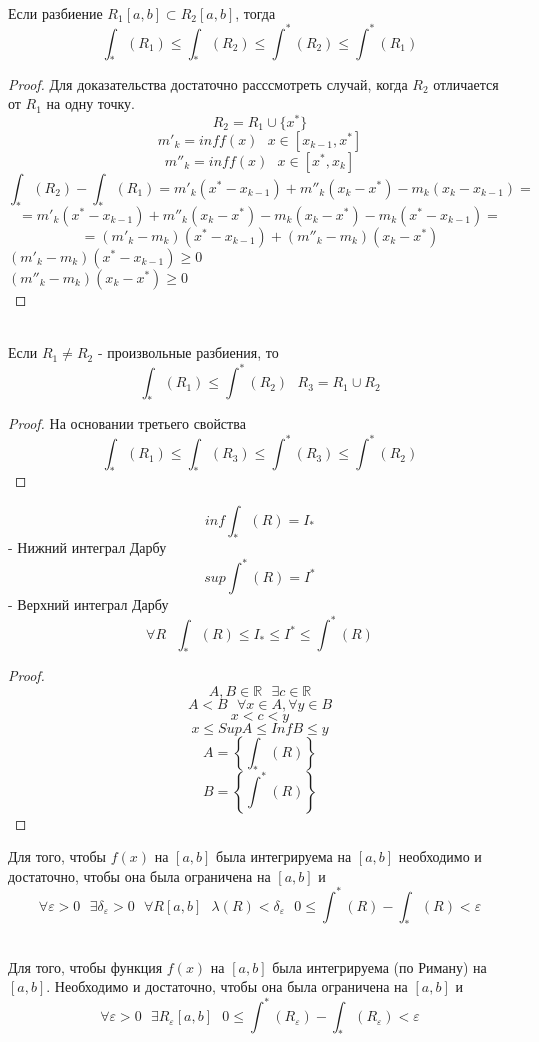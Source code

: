 \\
Если разбиение $R_1 [a,b] \subset R_2 [a,b]$, тогда
\[\int_* (R_1) \le \int_* (R_2) \le \int^* (R_2) \le \int^* (R_1)\]

\begin{proof}
  Для доказательства достаточно расссмотреть случай, когда $R_2$ отличается от
  $R_1$ на одну точку.
  \[R_2 = R_1 \cup \{x^*\}\]
  \[m'_k = inf f(x) ~~~ x \in [x_{k - 1}, x^*]\]
  \[m''_k = inf f(x) ~~~ x \in [x^*, x_k]\]
  \[
     \int_* (R_2) - \int_* (R_1) = m'_k (x^* - x_{k-1}) + m''_k (x_k - x^*) -
     m_k (x_k - x_{k - 1}) =
  \]
  \[
     = m'_k (x^* - x_{k - 1}) + m''_k (x_k - x^*) - m_k (x_k - x^*) -
     m_k (x^* - x_{k - 1}) =
  \]
  \[
     = (m'_k - m_k)(x^* - x_{k - 1}) + (m''_k - m_k)
     (x_k - x^*)
  \]
     $(m'_k - m_k)(x^* - x_{k - 1}) \ge 0 $\\
     $(m''_k - m_k)(x_k - x^*) \ge 0$\\
\end{proof}

\\
Если $R_1 \not= R_2$ - произвольные разбиения, то
\[\int_* (R_1) \le \int^* (R_2) ~~~ R_3 = R_1 \cup R_2\]

\begin{proof}
  На основании третьего свойства
  \[\int_* (R_1) \le \int_* (R_3) \le \int^* (R_3) \le \int^* (R_2)\]
\end{proof}

\[inf \int_* (R) = I_*\] - Нижний интеграл Дарбу
\[sup \int^* (R) = I^*\] - Верхний интеграл Дарбу
\[\forall R ~~~ \int_* (R) \le I_* \le I^* \le \int^* (R)\]

\begin{proof}
  \[A, B \in \mathbb R ~~~ \exists c \in \mathbb R\]
  \[A < B ~~~ \forall x \in A, \forall y \in B\]
  \[x < c < y\]
  \[x \le Sup A \le Inf B \le y\]
  \[A = \left\{ \int_* (R) \right\}\]
  \[B = \left\{ \int^* (R) \right\}\]
\end{proof}

\begin{theorem}
  Для того, чтобы $f(x)$ на $[a,b]$ была интегрируема на $[a,b]$ необходимо
  и достаточно, чтобы она была ограничена на $[a,b]$ и
  \[
    \forall \varepsilon > 0 ~~~ \exists \delta_\varepsilon > 0 ~~~ \forall R
    [a,b] ~~~ \lambda (R) < \delta_\varepsilon ~~~ 0 \le \int^* (R) -
    \int_* (R) < \varepsilon
  \]

  \\
  Для того, чтобы функция $f(x)$ на $[a,b]$ была интегрируема (по Риману)
  на $[a,b]$. Необходимо и достаточно, чтобы она была ограничена на $[a,b]$ и
  \[
    \forall \varepsilon > 0 ~~~ \exists R_\varepsilon [a,b] ~~~ 0 \le \int^*
    (R_\varepsilon) - \int_* (R_\varepsilon) < \varepsilon
  \]
\end{theorem}

